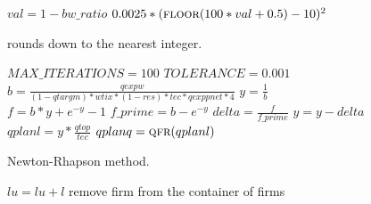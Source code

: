 \documentclass{article}
\begin{document}
\begin{algorithm}[!htbp]
\caption{Bw Ratio}
    \begin{algorithmic}
        \State \(val = 1 - bw\_ratio\)
        \State {}
        \State {}
        \Else
        \State \Return \(0.0025 * (\Call{floor}{100 * val + 0.5} - 10)^2\)
        \EndIf
        \EndFunction
    \end{algorithmic}
    \small {} rounds down to the nearest integer.
\end{algorithm}

\begin{algorithm}[!htbp]
\caption{Solve}
    \begin{algorithmic}
        \State $MAX\_ITERATIONS = 100$
        \State $TOLERANCE = 0.001$
        \State $b = \frac{qexpw}{(1 - qtargm) * wtix * (1 - res) * tec * qexppnet * 4}$
        \State $y = \frac{1}{b}$
        \\
        \State $f = b * y + e^{-y} - 1$
        \State $f\_prime = b - e^{-y}$
        \State $delta = \frac{f}{f\_prime}$
        \State $y = y - delta$
        \\
        \State $qplanl = y * \frac{qtop}{tec}$
        \State $qplanq = \Call{qfr}{qplanl}$
        \State \Return
        \EndIf
        \EndFor
        \EndFunction
    \end{algorithmic}
    \small Newton-Rhapson method.
\end{algorithm}

\begin{algorithm}[!htbp]
\caption{Nullify Firm}
    \begin{algorithmic}
        \State $lu = lu + l$
        \State remove firm from the container of firms
        \EndFunction
    \end{algorithmic}
\end{algorithm}
\end{document}
